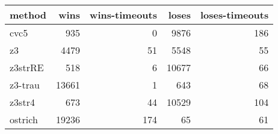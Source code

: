 \begin{tabular}{lrrrr}
\hline
 method   &   wins &   wins-timeouts &   loses &   loses-timeouts \\
\hline
 cvc5     &    935 &               0 &    9876 &              186 \\
 z3       &   4479 &              51 &    5548 &               55 \\
 z3strRE  &    518 &               6 &   10677 &               66 \\
 z3-trau  &  13661 &               1 &     643 &               68 \\
 z3str4   &    673 &              44 &   10529 &              104 \\
 ostrich  &  19236 &             174 &      65 &               61 \\
\hline
\end{tabular}
